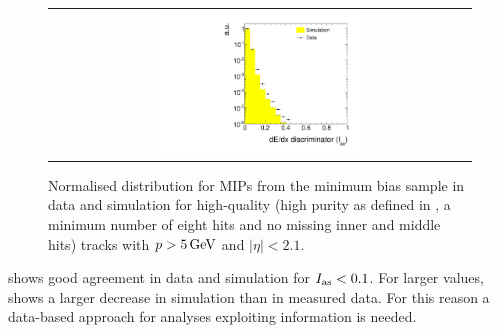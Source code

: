 \begin{figure}[!bt]
  \centering 
  \begin{tabular}{c}
    \includegraphics[width=0.49\textwidth]{figures/analysis_2/PixelCalibration/htrackASmiSmallRange_log_MIPs.pdf}
  \end{tabular}
  \caption{Normalised \ias distribution for MIPs from the minimum bias sample in data and simulation for high-quality (high purity as defined in \cite{bib:CMS:Tracking_2010}, a minimum number of eight hits and no missing inner and middle hits) tracks with $p>5\,\text{Ge}\kern-0.06667em\text{V}$ and $|\eta|<2.1$.}
  \label{fig:Data-MC-Dedx_MIPs}
\end{figure}
\dedx shows good agreement in data and simulation for $I_{\text{as}}<0.1$.
For larger values, \ias shows a larger decrease in simulation than in measured data.
For this reason a data-based approach for analyses exploiting \dedx information is needed.\\

